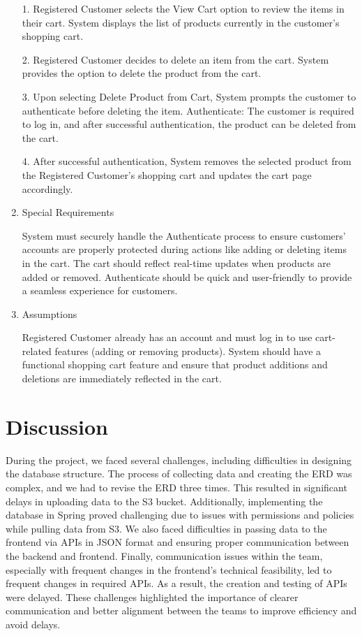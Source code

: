 \documentclass[conference]{IEEEtran}
\begin{document}
\begin{enumerate}
1. Registered Customer selects the View Cart option to review the items in their cart.
System displays the list of products currently in the customer's shopping cart.

2. Registered Customer decides to delete an item from the cart.
System provides the option to delete the product from the cart.

3. Upon selecting Delete Product from Cart, System prompts the customer to authenticate before deleting the item.
Authenticate: The customer is required to log in, and after successful authentication, the product can be deleted from the cart.

4. After successful authentication, System removes the selected product from the Registered Customer's shopping cart and updates the cart page accordingly.
\item Special Requirements

System must securely handle the Authenticate process to ensure customers' accounts are properly protected during actions like adding or deleting items in the cart.
The cart should reflect real-time updates when products are added or removed.
Authenticate should be quick and user-friendly to provide a seamless experience for customers.
\item Assumptions

Registered Customer already has an account and must log in to use cart-related features (adding or removing products).
System should have a functional shopping cart feature and ensure that product additions and deletions are immediately reflected in the cart.

\end{enumerate}

\section{Discussion}
\hspace*{1.2ex}
During the project, we faced several challenges, including difficulties in designing the database structure. The process of collecting data and creating the ERD was complex, and we had to revise the ERD three times. This resulted in significant delays in uploading data to the S3 bucket. Additionally, implementing the database in Spring proved challenging due to issues with permissions and policies while pulling data from S3. We also faced difficulties in passing data to the frontend via APIs in JSON format and ensuring proper communication between the backend and frontend. Finally, communication issues within the team, especially with frequent changes in the frontend's technical feasibility, led to frequent changes in required APIs. As a result, the creation and testing of APIs were delayed. These challenges highlighted the importance of clearer communication and better alignment between the teams to improve efficiency and avoid delays.
\end{document}
